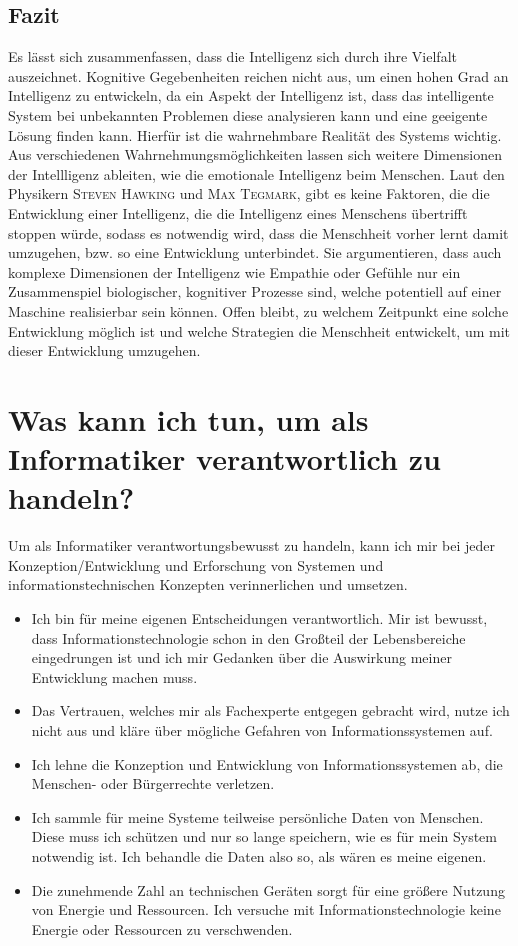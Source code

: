 \documentclass[a4paper, 11pt]{scrartcl}
\begin{document}
\subsection{Fazit}
Es lässt sich zusammenfassen, dass die Intelligenz sich durch ihre Vielfalt auszeichnet. Kognitive Gegebenheiten reichen nicht aus, um einen hohen Grad an Intelligenz zu entwickeln, da ein Aspekt der Intelligenz ist, dass das intelligente System bei unbekannten Problemen diese analysieren kann und eine geeigente Lösung finden kann. Hierfür ist die wahrnehmbare Realität des Systems wichtig. Aus verschiedenen Wahrnehmungsmöglichkeiten lassen sich weitere Dimensionen der Intellligenz ableiten, wie die emotionale Intelligenz beim Menschen. Laut den Physikern \textsc{Steven Hawking} und \textsc{Max Tegmark}, gibt es keine Faktoren, die die Entwicklung einer Intelligenz, die die Intelligenz eines Menschens übertrifft stoppen würde, sodass es notwendig wird, dass die Menschheit vorher lernt damit umzugehen, bzw. so eine Entwicklung unterbindet. Sie argumentieren, dass auch komplexe Dimensionen der Intelligenz wie Empathie oder Gefühle nur ein Zusammenspiel biologischer, kognitiver Prozesse sind, welche potentiell auf einer Maschine realisierbar sein können. Offen bleibt, zu welchem Zeitpunkt eine solche Entwicklung möglich ist und welche Strategien die Menschheit entwickelt, um mit dieser Entwicklung umzugehen.

\newpage



\section{Was kann ich tun, um als Informatiker verantwortlich zu handeln?}
Um als Informatiker verantwortungsbewusst zu handeln, kann ich mir bei jeder Konzeption/Entwicklung und Erforschung von Systemen und informationstechnischen Konzepten verinnerlichen und umsetzen.
\begin{itemize}
  \item Ich bin für meine eigenen Entscheidungen verantwortlich. Mir ist bewusst, dass Informationstechnologie schon in den Großteil der Lebensbereiche eingedrungen ist und ich mir Gedanken über die Auswirkung meiner Entwicklung machen muss.
  \item Das Vertrauen, welches mir als Fachexperte entgegen gebracht wird, nutze ich nicht aus und kläre über mögliche Gefahren von Informationssystemen auf.
  \item Ich lehne die Konzeption und Entwicklung von Informationssystemen ab, die Menschen- oder Bürgerrechte verletzen.
  \item Ich sammle für meine Systeme teilweise persönliche Daten von Menschen. Diese muss ich schützen und nur so lange speichern, wie es für mein System notwendig ist. Ich behandle die Daten also so, als wären es meine eigenen.
  \item Die zunehmende Zahl an technischen Geräten sorgt für eine größere Nutzung von Energie und Ressourcen. Ich versuche mit Informationstechnologie keine Energie oder Ressourcen zu verschwenden.
\end{itemize}
\end{document}
